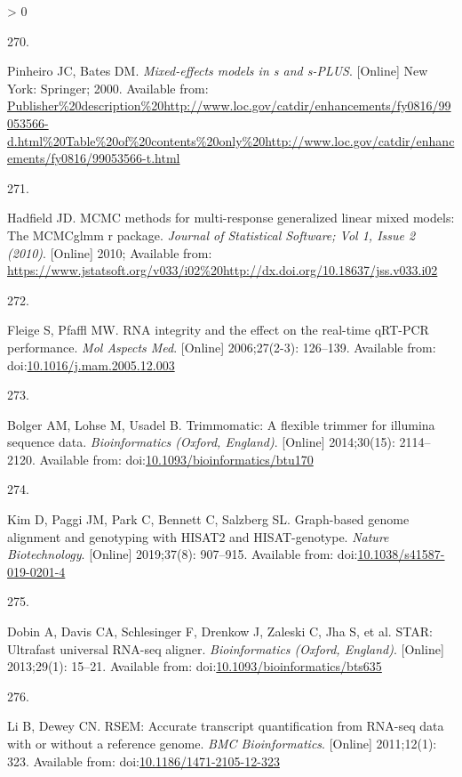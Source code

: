 \documentclass[twoside,10pt]{gihclass} %
\newlength{\cslhangindent}
\newlength{\csllabelwidth}
\newenvironment{CSLReferences}[3] %
 {%
  \setlength{\parindent}{0pt}
  \ifodd #1 \everypar{\setlength{\hangindent}{\cslhangindent}}\ignorespaces\fi
  \ifnum #2 > 0
  \setlength{\parskip}{#2\baselineskip}
  \fi
 }%
 {}
\newcommand{\CSLLeftMargin}[1]{\parbox[t]{\maxof{\widthof{#1}}{\csllabelwidth}}{#1}}
\newcommand{\CSLRightInline}[1]{\parbox[t]{\linewidth}{#1}}
\begin{document}
\begin{CSLReferences}{0}{0}
\leavevmode\hypertarget{ref-RN1986}{}%
\CSLLeftMargin{270. }
\CSLRightInline{Pinheiro JC, Bates DM. \emph{Mixed-effects models in s and s-PLUS}. {[}Online{]} New York: Springer; 2000. Available from: \url{Publisher\%20description\%20http://www.loc.gov/catdir/enhancements/fy0816/99053566-d.html\%20Table\%20of\%20contents\%20only\%20http://www.loc.gov/catdir/enhancements/fy0816/99053566-t.html}}

\leavevmode\hypertarget{ref-RN1992}{}%
\CSLLeftMargin{271. }
\CSLRightInline{Hadfield JD. MCMC methods for multi-response generalized linear mixed models: The MCMCglmm r package. \emph{Journal of Statistical Software; Vol 1, Issue 2 (2010)}. {[}Online{]} 2010; Available from: \url{https://www.jstatsoft.org/v033/i02\%20http://dx.doi.org/10.18637/jss.v033.i02}}

\leavevmode\hypertarget{ref-RN2248}{}%
\CSLLeftMargin{272. }
\CSLRightInline{Fleige S, Pfaffl MW. RNA integrity and the effect on the real-time qRT-PCR performance. \emph{Mol Aspects Med}. {[}Online{]} 2006;27(2-3): 126--139. Available from: doi:\href{https://doi.org/10.1016/j.mam.2005.12.003}{10.1016/j.mam.2005.12.003}}

\leavevmode\hypertarget{ref-RN2382}{}%
\CSLLeftMargin{273. }
\CSLRightInline{Bolger AM, Lohse M, Usadel B. Trimmomatic: A flexible trimmer for illumina sequence data. \emph{Bioinformatics (Oxford, England)}. {[}Online{]} 2014;30(15): 2114--2120. Available from: doi:\href{https://doi.org/10.1093/bioinformatics/btu170}{10.1093/bioinformatics/btu170}}

\leavevmode\hypertarget{ref-RN2385}{}%
\CSLLeftMargin{274. }
\CSLRightInline{Kim D, Paggi JM, Park C, Bennett C, Salzberg SL. Graph-based genome alignment and genotyping with HISAT2 and HISAT-genotype. \emph{Nature Biotechnology}. {[}Online{]} 2019;37(8): 907--915. Available from: doi:\href{https://doi.org/10.1038/s41587-019-0201-4}{10.1038/s41587-019-0201-4}}

\leavevmode\hypertarget{ref-RN2386}{}%
\CSLLeftMargin{275. }
\CSLRightInline{Dobin A, Davis CA, Schlesinger F, Drenkow J, Zaleski C, Jha S, et al. STAR: Ultrafast universal RNA-seq aligner. \emph{Bioinformatics (Oxford, England)}. {[}Online{]} 2013;29(1): 15--21. Available from: doi:\href{https://doi.org/10.1093/bioinformatics/bts635}{10.1093/bioinformatics/bts635}}

\leavevmode\hypertarget{ref-RN2387}{}%
\CSLLeftMargin{276. }
\CSLRightInline{Li B, Dewey CN. RSEM: Accurate transcript quantification from RNA-seq data with or without a reference genome. \emph{BMC Bioinformatics}. {[}Online{]} 2011;12(1): 323. Available from: doi:\href{https://doi.org/10.1186/1471-2105-12-323}{10.1186/1471-2105-12-323}}


\end{CSLReferences}
\end{document}
